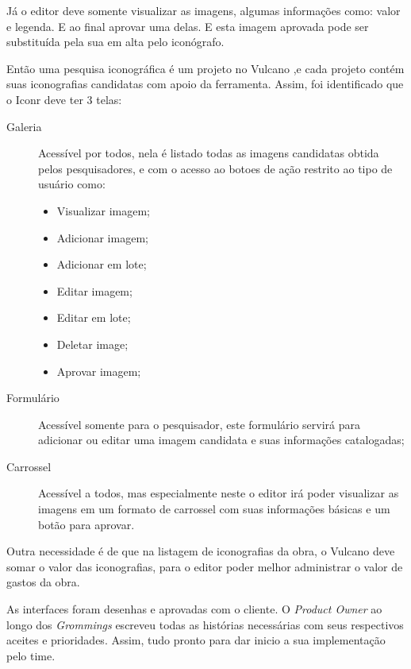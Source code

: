 \documentclass[
  12pt,				%
  openany,
  oneside,
  a4paper,			%
  english,			%
  brazil
]{article}
\numberwithin{figure}{section}
\numberwithin{table}{section}
\begin{document}
Já o editor deve somente visualizar as imagens, algumas informações como: valor e legenda. E ao final aprovar uma delas. E esta imagem aprovada pode ser substituída pela sua em alta pelo iconógrafo.

Então uma pesquisa iconográfica é um projeto no Vulcano ,e cada projeto contém suas iconografias candidatas com apoio da ferramenta. Assim, foi identificado que o Iconr deve ter 3 telas:

\begin{description}
	\item[Galeria] Acessível por todos, nela é listado todas as imagens candidatas obtida pelos pesquisadores, e com o acesso ao botoes de ação restrito ao tipo de usuário como:
	
	\vspace{-10mm}
	\begin{singlespace}
		\begin{itemize}
			\item Visualizar imagem;
			\item Adicionar imagem;
			\item Adicionar em lote;
			\item Editar imagem;
			\item Editar em lote;
			\item Deletar image;
			\item Aprovar imagem;
		\end{itemize}
	\end{singlespace}
	\vspace{-5mm}

	\item[Formulário] Acessível somente para o pesquisador, este formulário servirá para adicionar ou editar uma imagem candidata e suas informações catalogadas;
	
	\item[Carrossel] Acessível a todos, mas especialmente neste o editor irá poder visualizar as imagens em um formato de carrossel com suas informações básicas e um botão para aprovar.
\end{description}

Outra necessidade é de que na listagem de iconografias da obra, o Vulcano deve somar o valor das iconografias, para o editor poder melhor administrar o valor de gastos da obra.

As interfaces foram desenhas e aprovadas com o cliente. O \textit{Product Owner} ao longo dos \textit{Grommings} escreveu todas as histórias necessárias com seus respectivos aceites e prioridades. Assim, tudo pronto para dar inicio a sua implementação pelo time.
\end{document}
